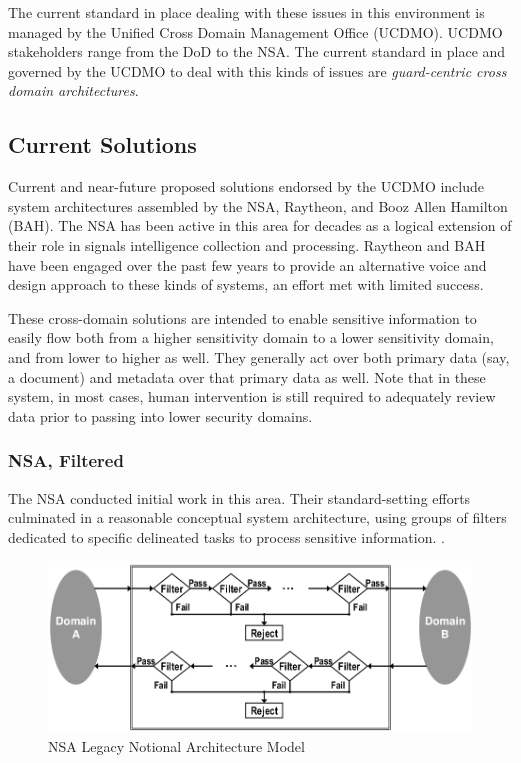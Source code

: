 \documentclass[12pt,letterpaper]{article}
\begin{document}
The current standard in place dealing with these issues in this environment is managed by the Unified Cross Domain Management Office (UCDMO).  UCDMO stakeholders range from the DoD to the NSA.  The current standard in place and governed by the UCDMO to deal with this kinds of issues are \textit{guard-centric cross domain architectures}.

\subsection{Current Solutions}
Current and near-future proposed solutions endorsed by the UCDMO include system architectures assembled by the NSA, Raytheon, and Booz Allen Hamilton (BAH).   The NSA has been active in this area for decades as a logical extension of their role in signals intelligence collection and processing.  Raytheon and BAH have been engaged over the past few years to provide an alternative voice and design approach to these kinds of systems, an effort met with limited success.

These cross-domain solutions are intended to enable sensitive information to easily flow both from a higher sensitivity domain to a lower sensitivity domain, and from lower to higher as well.  They generally act over both primary data (say, a document) and metadata over that primary data as well.  Note that in these system, in most cases, human intervention is still required to adequately review data prior to passing into lower security domains.

\subsubsection{NSA, Filtered}
The NSA conducted initial work in this area.  Their standard-setting efforts culminated in a reasonable conceptual system architecture, using groups of filters dedicated to specific delineated tasks to process sensitive information. \cite{proposal:nsa-arch}.

\begin{figure}[!t]
\centering
\includegraphics[width=5in]{nsa-legacy-arch}
\caption{NSA Legacy Notional Architecture Model}
\label{fig:model:conceptual-model}
\end{figure}
\end{document}
